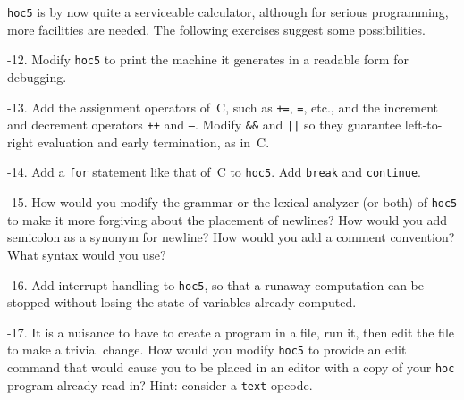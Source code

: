 {\tt hoc5} is by now quite a serviceable calculator, although for
serious programming, more facilities are needed. The following
exercises suggest some possibilities.

-12.
Modify {\tt hoc5} to print the machine it generates in a readable
form for debugging.\endexercise

-13.
Add the assignment operators of~C, such as {\tt+=}, {\tt*=}, etc.,
and the increment and decrement operators {\tt++} and {\tt--}.
Modify {\tt\&\&} and {\tt||} so they guarantee left-to-right
evaluation and early termination, as in~C.\endexercise

-14.
Add a {\tt for} statement like that of~C to {\tt hoc5}.
Add {\tt break} and {\tt continue}.\endexercise

-15.
How would you modify the grammar or the lexical analyzer (or both)
of {\tt hoc5} to make it more forgiving about the placement of
newlines? How would you add semicolon as a synonym for newline?
How would you add a comment convention?
What syntax would you use?\endexercise

-16.
Add interrupt handling to {\tt hoc5}, so that a runaway computation
can be stopped without losing the state of variables already
computed.\endexercise

-17.
It is a nuisance to have to create a program in a file, run it,
then edit the file to make a trivial change. How would you modify
{\tt hoc5} to provide an edit command that would cause you to be
placed in an editor with a copy of your {\tt hoc} program already
read in? Hint: consider a {\tt text} opcode.\endexercise

\bye
